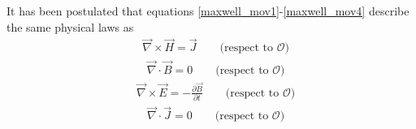 \documentclass[12pt,a4paper,oneside]{book}
\begin{document}
\begin{onehalfspace}
It has been postulated that equations \ref{maxwell_mov1}-\ref{maxwell_mov4} 
describe the same physical laws as 
\begin{equation}\label{maxwell_fix1}
	\begin{aligned}
		&\vec{\nabla}\times\vec{H} = \vec{J}\qquad\text{(respect to 
		$\mathcal{O}$)}
	\end{aligned}
\end{equation} 
\begin{equation}\label{maxwell_fix2}
	\begin{aligned}
		&\vec{\nabla}\cdot\vec{B} = 0\qquad\text{(respect to $\mathcal{O}$)}
	\end{aligned}
\end{equation} 
\begin{equation}\label{maxwell_fix3}
	\begin{aligned}
		&\vec{\nabla}\times\vec{E} = -\frac{\partial\vec{B}}{\partial 
		t}\qquad\text{(respect to $\mathcal{O}$)}
	\end{aligned}
\end{equation} 
\begin{equation}\label{maxwell_fix4}
	\begin{aligned}
		&\vec{\nabla}\cdot\vec{J} = 0\qquad\text{(respect to $\mathcal{O}$)}
	\end{aligned}
\end{equation} 


\end{onehalfspace}
\end{document}
